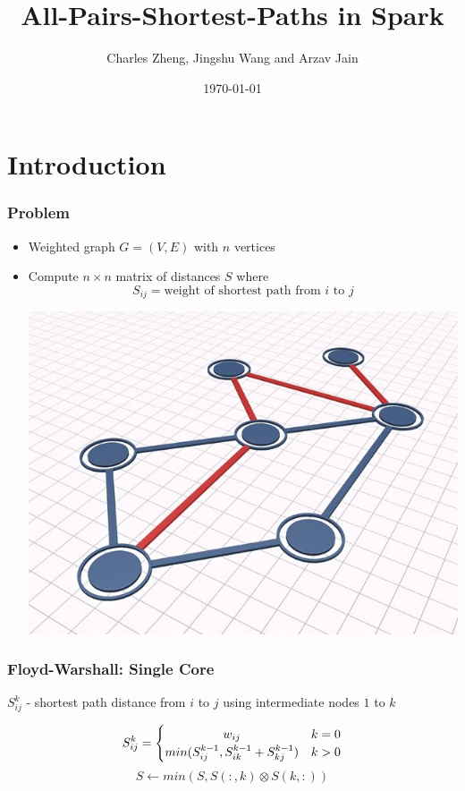 \documentclass{beamer}
\title{All-Pairs-Shortest-Paths in Spark}
\author{Charles Zheng, Jingshu Wang and Arzav Jain} %
\institute[Stanford] %
{Stanford University}
\date{\today} %
\begin{document}
\begin{frame}
\titlepage %
\end{frame}

\section{Introduction}

\begin{frame}
\frametitle{Problem}
\begin{itemize}
\item Weighted graph $G = (V, E)$ with $n$ vertices
\item Compute $n \times n$ matrix of distances $S$ where
\[
S_{ij} = \text{weight of shortest path from $i$ to $j$}
\]
\begin{center}
\includegraphics[scale = 0.3]{stock_sp.jpg}
\end{center}
\end{itemize}
\end{frame}

\begin{frame}
\frametitle{Floyd-Warshall: Single Core}
\vspace{3mm}
$S_{ij}^k$ - shortest path distance from $i$ to $j$ using intermediate nodes $1$ to $k$

\[
S_{ij}^k =
\begin{cases} 
      \hfill w_{ij} \hfill & k=0 \\
      \hfill min(S_{ij}^{k-1}, S_{ik}^{k-1} + S_{kj}^{k-1}) \hfill & k>0
\end{cases}
\]
\vspace{3mm}
\[
S \leftarrow min(S, S(:, k) \otimes S(k, :))
\]
\end{frame}
\end{document}
